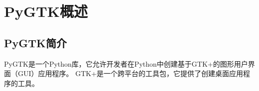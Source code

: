 \chapter{PyGTK概述}
\section{PyGTK简介}
PyGTK是一个Python库，它允许开发者在Python中创建基于GTK+的图形用户界面（GUI）应用程序。
GTK+是一个跨平台的工具包，它提供了创建桌面应用程序的工具。




